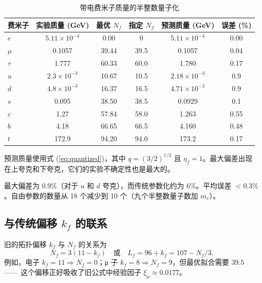 \documentclass[12pt,a4paper]{article}
\begin{document}
	\begin{table}[htbp]
		\centering
		\caption{带电费米子质量的半整数量子化}
		\label{tab:masses}
		\begin{tabular}{l c c c c c}
			\toprule
			费米子 & 实验质量 (GeV) & 最优 $N_f$ & 指定 $N_f$ & 预测质量 (GeV) & 误差 (\%) \\
			\midrule
			$e$   & $5.11\times10^{-4}$ & 0.00  & 0      & $5.11\times10^{-4}$ & 0.00 \\
			$\mu$  & 0.1057                & 39.44 & 39.5   & 0.1057               & 0.04 \\
			$\tau$ & 1.777                 & 60.33 & 60.0   & 1.780                & 0.17 \\
			$u$   & $2.3\times10^{-3}$    & 10.67 & 10.5   & $2.18\times10^{-3}$  & 0.9 \\
			$d$   & $4.8\times10^{-3}$    & 16.37 & 16.5   & $4.71\times10^{-3}$  & 0.9 \\
			$s$   & 0.095                 & 38.50 & 38.5   & 0.0929               & 0.1 \\
			$c$   & 1.27                  & 57.84 & 58.0   & 1.263                & 0.55 \\
			$b$   & 4.18                  & 66.65 & 66.5   & 4.160                & 0.48 \\
			$t$   & 172.9                 & 94.20 & 94.0   & 173.2                & 0.17 \\
			\bottomrule
		\end{tabular}
		\par\smallskip
		\footnotesize 预测质量使用式 (\ref{eq:quantized})，其中 $q = (3/2)^{1/3}$ 且 $\eta_f = 1$。最大偏差出现在上夸克和下夸克，它们的实验不确定性也是最大的。
	\end{table}
	
	最大偏差为 $0.9\%$（对于 $u$ 和 $d$ 夸克），而传统参数化约为 $6\%$。平均误差 $<0.3\%$。自由参数的数量从 18 个减少到 10 个（九个半整数量子数加 $m_e$）。
	
	\subsection{与传统偏移 $k_f$ 的联系}
	
	旧的拓扑偏移 $k_f$ 与 $N_f$ 的关系为
	\begin{equation}
		N_f = 3(11 - k_f) \quad \text{或} \quad L_f = 96 + k_f = 107 - N_f/3.
	\end{equation}
	例如，电子 $k_f = 11 \Rightarrow N_f = 0$；μ 子 $k_f = 8 \Rightarrow N_f = 9$，但最优拟合需要 $39.5$ —— 这个偏移正好吸收了旧公式中经验因子 $\xi_\mu \approx 0.0177$。
	
\end{document}
